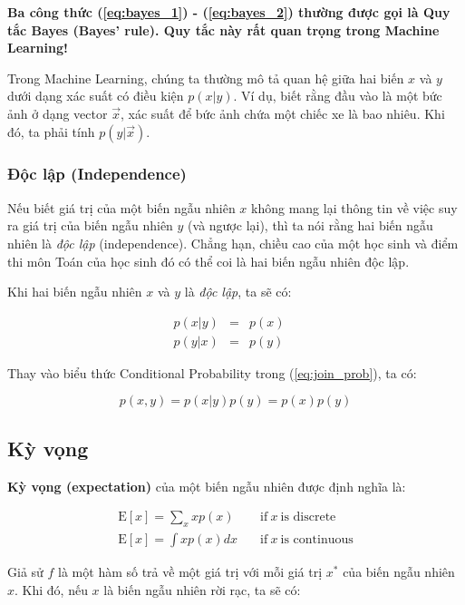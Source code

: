 \documentclass[../main-report.tex]{subfiles}
\begin{document}
\textbf{Ba công thức (\ref{eq:bayes_1}) - (\ref{eq:bayes_2}) thường được gọi là Quy tắc Bayes (Bayes' rule). Quy tắc này rất quan trọng trong Machine Learning!}

Trong Machine Learning, chúng ta thường mô tả quan hệ giữa hai biến \(x\) và \(y\) dưới dạng xác suất có điều kiện \(p(x|y)\). Ví dụ, biết rằng đầu vào là một bức ảnh ở dạng vector \(\vec{x}\), xác suất để bức ảnh chứa một chiếc xe là bao nhiêu. Khi đó, ta phải tính \(p(y | \vec{x})\).

\subsubsection*{Độc lập (Independence)}
Nếu biết giá trị của một biến ngẫu nhiên \(x\) không mang lại thông tin về việc suy ra giá trị của biến ngẫu nhiên \(y\) (và ngược lại), thì ta nói rằng hai biến ngẫu nhiên là \emph{độc lập} (independence). Chẳng hạn, chiều cao của một học sinh và điểm thi môn Toán của học sinh đó có thể coi là hai biến ngẫu nhiên độc lập.

Khi hai biến ngẫu nhiên \(x\) và \(y\) là \emph{độc lập}, ta sẽ có:


\begin{eqnarray}
  p(x | y) &=& p(x) \quad \\
  p(y | x) &=& p(y)
\end{eqnarray}


Thay vào biểu thức Conditional Probability trong (\ref{eq:join_prob}), ta có:

\begin{equation}
	p(x, y) = p(x | y) p(y) = p(x) p(y)
\end{equation}


\subsection{Kỳ vọng}
\textbf{Kỳ vọng (expectation)} của một biến ngẫu nhiên được định nghĩa là:


\begin{eqnarray}
  \text{E}[x] = \sum_x x p(x) \quad & \text{if}~ x ~ \text{is discrete} \quad \\
  \text{E}[x] = \int x p(x) dx \quad & \text{if}~ x ~ \text{is continuous}
\end{eqnarray}

Giả sử \(f\) là một hàm số trả về một giá trị với mỗi giá trị \(x^*\) của biến ngẫu nhiên \(x\). Khi đó, nếu \(x\) là biến ngẫu nhiên rời rạc, ta sẽ có:
\end{document}
